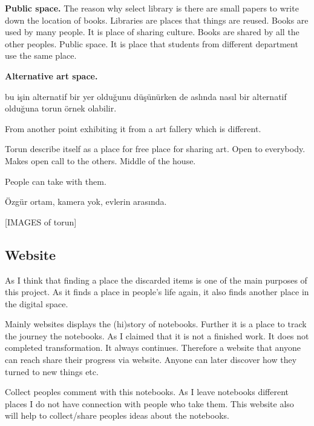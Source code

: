 {\textbf{Public space.} The reason why select library is there are small papers to write down the location of books. Libraries are places that things are reused. Books are used by many people. It is place of sharing culture. Books are shared by all the other peoples. Public space. It is place that students from different department use the same place.





\textbf{Alternative art space.} 

bu işin alternatif bir yer olduğunu düşünürken de aslında nasıl bir alternatif olduğuna torun örnek olabilir.

From another point exhibiting it from a art fallery which is different.

Torun describe itself as a place for free place for sharing art. Open to everybody. Makes open call to the others. Middle of the house. 

People can take with them. 

Özgür ortam, kamera yok, evlerin arasında.

[IMAGES of torun]





%
%
\subsection{Website}
As I think that finding a place the discarded items is one of the main purposes of this project. As it finds a place in people's life again, it also finds another place in the digital space.

Mainly websites displays the (hi)story of notebooks. Further it is a place to track the journey the notebooks. As I claimed that it is not a finished work. It does not completed transformation. It always continues. Therefore a website that anyone can reach share their progress via website. Anyone can later discover how they turned to new things etc.

Collect peoples comment with this notebooks. As I leave notebooks different places I do not have connection with people who take them. This website also will help to collect/share peoples ideas about the notebooks.

}
